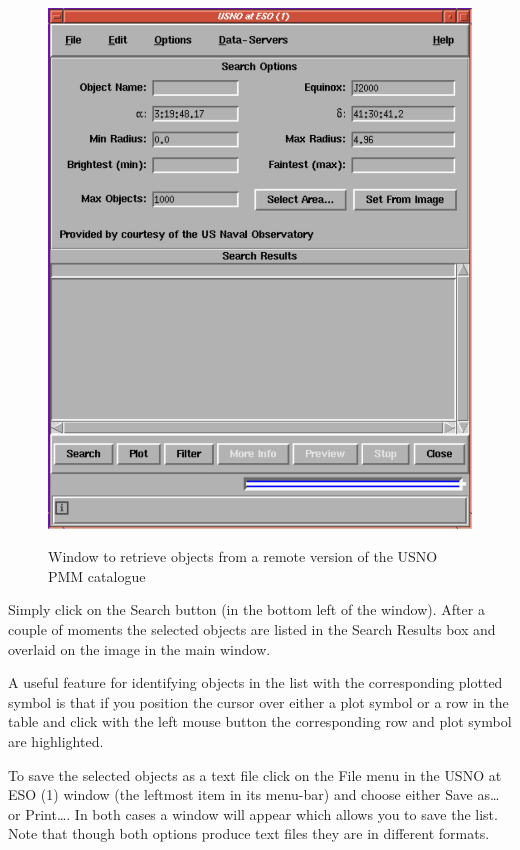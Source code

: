 \documentclass[twoside,11pt]{starlink}
\begin{document}
\begin{enumerate}
  \begin{figure}[htbp]
     \centering
     \includegraphics[totalheight=4in]{sc17_retriev_r_pmm}
     \begin{quote}
     \caption[Window to retrieve a remote catalogue]
      {Window to retrieve objects from a remote version of the USNO
      PMM catalogue
     \label{RETRIEV_R_PMM} }
     \end{quote}
  \end{figure}

   Simply click on the \textsf{Search} button (in the bottom left of the
   window).  After a couple of moments the selected objects are listed
   in the \textsf{Search Results} box and overlaid on the image in
   the main window.

   A useful feature for identifying objects in the list with the
   corresponding plotted symbol is that if you position the cursor over
   either a plot symbol or a row in the table and click with the left
   mouse button the corresponding row and plot symbol are highlighted.

   To save the selected objects as a text file click on the \textsf{File}
   menu in the \textsf{USNO at ESO (1)} window (the leftmost item in its
   menu-bar) and choose either \textsf{Save as\ldots} or \textsf{Print\ldots}.
   In both cases a window will appear which allows you to save the list.
   Note that though both options produce text files they are in different
   formats.


\end{enumerate}
\end{document}
